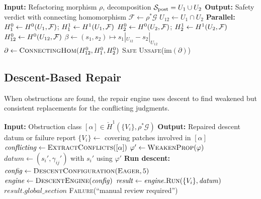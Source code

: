 \documentclass[11pt]{article}
\newcommand{\SitePost}{\Site_{\mathrm{post}}}
\newcommand{\RefactorMorph}{\rho}
\newcommand{\im}{\mathrm{im}}                       %
\newcommand{\GluingMap}{\gamma}                      %
\begin{document}
\begin{algorithm}[H]
\caption{Mayer-Vietoris Safety Check}
\label{alg:mayer-vietoris}
\begin{algorithmic}[1]
\STATE \textbf{Input:} Refactoring morphism $\RefactorMorph$,
       decomposition $\SitePost = U_1 \cup U_2$
\STATE \textbf{Output:} Safety verdict with connecting homomorphism
\STATE $\mathcal{F} \gets \RefactorMorph^*\mathcal{G}$
\STATE $U_{12} \gets U_1 \cap U_2$
\STATE \textbf{Parallel:}
\STATE \quad $H^0_1 \gets H^{0}(U_1, \mathcal{F})$;
       $H^1_1 \gets H^{1}(U_1, \mathcal{F})$
\STATE \quad $H^0_2 \gets H^{0}(U_2, \mathcal{F})$;
       $H^1_2 \gets H^{1}(U_2, \mathcal{F})$
\STATE $H^0_{12} \gets H^{0}(U_{12}, \mathcal{F})$
\STATE $\beta \gets (s_1, s_2) \mapsto s_1|_{U_{12}} - s_2|_{U_{12}}$
\STATE $\partial \gets \textsc{ConnectingHom}(H^0_{12}, H^0_1,
       H^0_2)$
  \RETURN \textsc{Safe}
\ELSE
  \RETURN \textsc{Unsafe}($\im(\partial)$)
\ENDIF
\end{algorithmic}
\end{algorithm}

\subsection{Descent-Based Repair}\label{ssec:descent-repair}

When obstructions are found, the repair engine uses descent to find
weakened but consistent replacements for the conflicting judgments.

\begin{algorithm}[H]
\caption{Descent-Based Obstruction Repair}
\label{alg:descent-repair}
\begin{algorithmic}[1]
\STATE \textbf{Input:} Obstruction class $[\alpha] \in
       \check{H}^1(\{V_i\}, \RefactorMorph^*\mathcal{G})$
\STATE \textbf{Output:} Repaired descent datum or failure report
\STATE $\{V_i\} \gets$ covering patches involved in $[\alpha]$
\STATE $\mathit{conflicting} \gets
       \textsc{ExtractConflicts}([\alpha])$
  \STATE $\varphi' \gets \textsc{WeakenProp}(\varphi)$
  \STATE $\mathit{datum} \gets (s_i', \GluingMap_{ij}')$
         with $s_i'$ using $\varphi'$
    \STATE \textbf{Run descent:}
    \STATE $\mathit{config} \gets
           \textsc{DescentConfiguration}(\textsc{Eager}, 5)$
    \STATE $\mathit{engine} \gets \textsc{DescentEngine}(\mathit{config})$
    \STATE $\mathit{result} \gets \mathit{engine}.\textsc{Run}(
           \{V_i\}, \mathit{datum})$
      \RETURN $\mathit{result}.\mathit{global\_section}$
    \ENDIF
  \ENDIF
\ENDFOR
\RETURN \textsc{Failure}(``manual review required'')
\end{algorithmic}
\end{algorithm}
\end{document}
